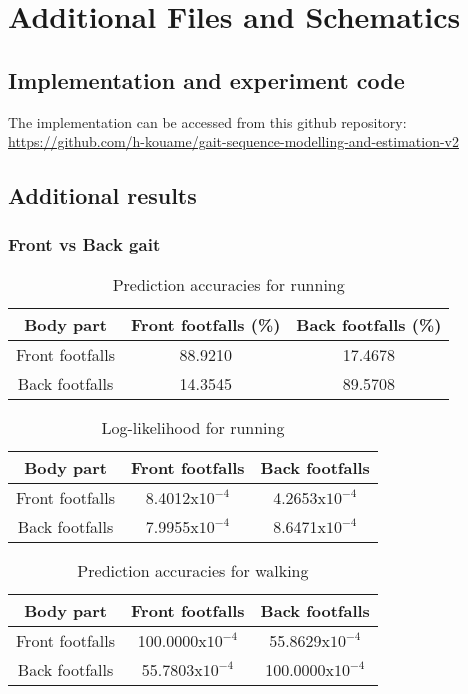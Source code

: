 \chapter{Additional Files and Schematics}

\section{Implementation and experiment code} \label{apdix-repo}
The implementation can be accessed from this github repository: \href{https://github.com/h-kouame/gait-sequence-modelling-and-estimation-v2}{https://github.com/h-kouame/gait-sequence-modelling-and-estimation-v2}

\section{Additional results} \label{apdix-results}

\subsection{Front vs Back gait}
\begin{table}[h!] 
	\centering
	\begin{tabular}{ |c|c|c|} 	
		\hline	
		\textbf{Body part} & \textbf{Front footfalls (\%)} &  \textbf{Back footfalls (\%)}\\ 
		\hline
		Front footfalls & 88.9210 & 17.4678\\ 
		\hline
		Back footfalls & 14.3545 & 89.5708 \\ 
		\hline	   	
	\end{tabular}
	\caption{Prediction accuracies for running}
	\label{tab:front-back-run-acc}
\end{table}

\begin{table}[h!] 
	\centering
	\begin{tabular}{ |c|c|c|} 	
		\hline	
		\textbf{Body part} & \textbf{Front footfalls} &  \textbf{Back footfalls}\\ 
		\hline
		Front footfalls &  8.4012x\(10^{-4}\) & 4.2653x\(10^{-4}\)\\ 
		\hline
		Back footfalls & 7.9955x\(10^{-4}\) & 8.6471x\(10^{-4}\) \\ 
		\hline	   	
	\end{tabular}
	\caption{Log-likelihood for running}
	\label{tab:front-back-run-log}
\end{table}


\begin{table}[h!] 
	\centering
	\begin{tabular}{ |c|c|c|} 	
		\hline	
		\textbf{Body part} & \textbf{Front footfalls} &  \textbf{Back footfalls}\\ 
		\hline
		Front footfalls &  100.0000x\(10^{-4}\) & 55.8629x\(10^{-4}\)\\ 
		\hline
		Back footfalls & 55.7803x\(10^{-4}\) & 100.0000x\(10^{-4}\) \\ 
		\hline	   	
	\end{tabular}
	\caption{Prediction accuracies for walking}
	\label{tab:front-back-walk-acc}
\end{table}

